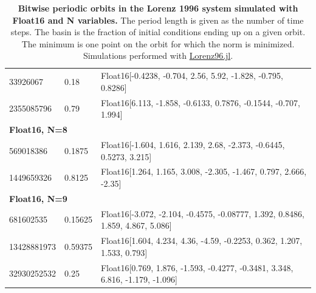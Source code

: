 \begin{table}[htbp]
\begin{tabular}{l | l | l}
33926067 & 0.18 & Float16[-0.4238, -0.704, 2.56, 5.92, -1.828, -0.795, 0.8286] \\
2355085796 & 0.79 & Float16[6.113, -1.858, -0.6133, 0.7876, -0.1544, -0.707, 1.994] \\
	\multicolumn{3}{l}{\textbf{Float16, N=8}}  \\
569018386 & 0.1875 & Float16[-1.604, 1.616, 2.139, 2.68, -2.373, -0.6445, 0.5273, 3.215] \\
1449659326 & 0.8125 & Float16[1.264, 1.165, 3.008, -2.305, -1.467, 0.797, 2.666, -2.35] \\
	\multicolumn{3}{l}{\textbf{Float16, N=9}} \\
681602535 & 0.15625 & Float16[-3.072, -2.104, -0.4575, -0.08777, 1.392, 0.8486, 1.859, 4.867, 5.086] \\
13428881973 & 0.59375 & Float16[1.604, 4.234, 4.36, -4.59, -0.2253, 0.362, 1.207, 1.533, 0.793] \\
32930252532 & 0.25 & Float16[0.769, 1.876, -1.593, -0.4277, -0.3481, 3.348, 6.816, -1.179, -1.096]
        \end{tabular}
	\caption{\textbf{Bitwise periodic orbits in the Lorenz 1996 system simulated with Float16 and N variables.}
	The period length is given as the number of time steps. The basin is the fraction of initial conditions ending
	up on a given orbit. The minimum is one point on the orbit for which the  norm is minimized. Simulations
	performed with \href{https://github.com/milankl/Lorenz96.jl}{Lorenz96.jl}.}
	\label{tab:orbits}
\end{table}

